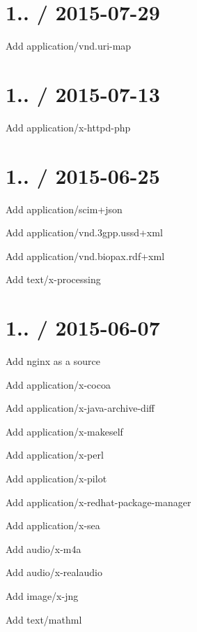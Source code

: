 \section*{1.. / 2015-\/07-\/29 }


\begin{DoxyItemize}
\item Add {\ttfamily application/vnd.\+uri-\/map}
\end{DoxyItemize}

\section*{1.. / 2015-\/07-\/13 }


\begin{DoxyItemize}
\item Add {\ttfamily application/x-\/httpd-\/php}
\end{DoxyItemize}

\section*{1.. / 2015-\/06-\/25 }


\begin{DoxyItemize}
\item Add {\ttfamily application/scim+json}
\item Add {\ttfamily application/vnd.\+3gpp.\+ussd+xml}
\item Add {\ttfamily application/vnd.\+biopax.\+rdf+xml}
\item Add {\ttfamily text/x-\/processing}
\end{DoxyItemize}

\section*{1.. / 2015-\/06-\/07 }


\begin{DoxyItemize}
\item Add nginx as a source
\item Add {\ttfamily application/x-\/cocoa}
\item Add {\ttfamily application/x-\/java-\/archive-\/diff}
\item Add {\ttfamily application/x-\/makeself}
\item Add {\ttfamily application/x-\/perl}
\item Add {\ttfamily application/x-\/pilot}
\item Add {\ttfamily application/x-\/redhat-\/package-\/manager}
\item Add {\ttfamily application/x-\/sea}
\item Add {\ttfamily audio/x-\/m4a}
\item Add {\ttfamily audio/x-\/realaudio}
\item Add {\ttfamily image/x-\/jng}
\item Add {\ttfamily text/mathml}
\end{DoxyItemize}


